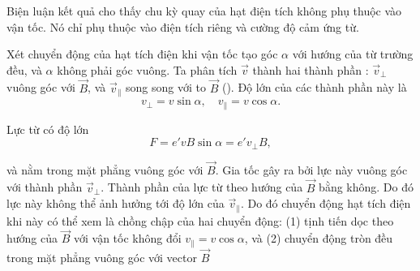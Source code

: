 \noindent
Biện luận kết quả  cho thấy chu kỳ quay của hạt điện tích không phụ thuộc vào vận tốc. 
Nó chỉ phụ thuộc vào điện tích riêng và cường độ cảm ứng từ.

Xét chuyển động của hạt tích điện khi vận tốc tạo góc $\alpha$ với hướng của từ trường đều, và  $\alpha$ không phải góc vuông.
Ta phân tích $\vec{v}$ thành hai thành phần : $\vec{v}_{\perp}$ vuông góc với $\vec{B}$, và  $\vec{v}_{\parallel}$ song song với to $\vec{B}$ ().
Độ lớn của các thành phần này là
\begin{equation*}
    v_{\perp} = v\sin\alpha,\quad v_{\parallel}=v\cos\alpha.
\end{equation*}

Lực từ có độ lớn
\begin{equation*}
    F = e' v B \sin\alpha = e' v_{\perp} B,
\end{equation*}

\noindent
và nằm trong mặt phẳng vuông góc với $\vec{B}$.
Gia tốc gây ra bởi lực này vuông góc với thành phần $\vec{v}_{\perp}$.
Thành phần của lực từ theo hướng của $\vec{B}$ bằng không.
Do đó lực này không thể ảnh hưởng tới độ lớn của $\vec{v}_{\parallel}$.
Do đó chuyển động hạt tích điện khi này có thể xem là chồng chập của hai chuyển động: (1) tịnh tiến dọc theo hướng của $\vec{B}$ với vận tốc không đổi $v_{\parallel}=v\cos\alpha$, và (2) chuyển động tròn đều trong mặt phẳng vuông góc với vector $\vec{B}$

